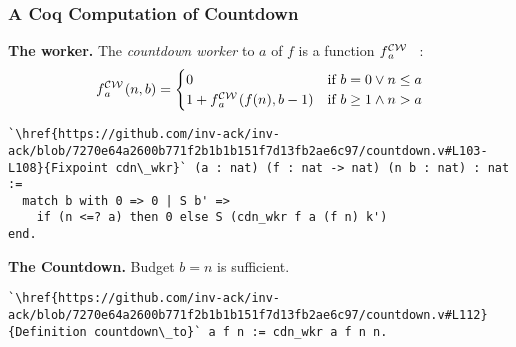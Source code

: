 \begin{frame}[fragile]
\frametitle{A Coq Computation of Countdown}

\textbf{The worker.}
The \emph{countdown worker}
to $a$ of $f$ is a function $\cdw{f}{a}$~~:
\begin{equation*}
\cdw{f}{a}(n, b) = \begin{cases}
0 & \text{if } b = 0 \vee n\le a \\ 1 +\cdw{f}{a}(f(n), b-1) & \text{if } b \ge 1 \wedge n > a
\end{cases}
\end{equation*}

\begin{lstlisting}
`\href{https://github.com/inv-ack/inv-ack/blob/7270e64a2600b771f2b1b1b151f7d13fb2ae6c97/countdown.v#L103-L108}{Fixpoint cdn\_wkr}` (a : nat) (f : nat -> nat) (n b : nat) : nat :=
  match b with 0 => 0 | S b' =>
    if (n <=? a) then 0 else S (cdn_wkr f a (f n) k')
end.
\end{lstlisting}

\bigskip

\pause 
\textbf{The Countdown.} Budget $b = n$ is sufficient.
\begin{lstlisting}
`\href{https://github.com/inv-ack/inv-ack/blob/7270e64a2600b771f2b1b1b151f7d13fb2ae6c97/countdown.v#L112}{Definition countdown\_to}` a f n := cdn_wkr a f n n.
\end{lstlisting}
\end{frame}


%
%	
%	
%	


